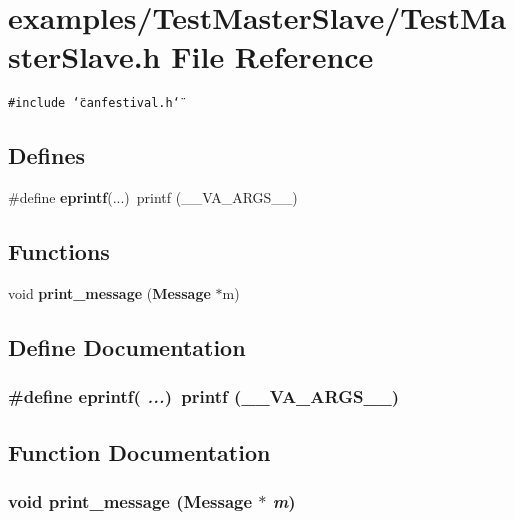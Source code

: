 \section{examples/Test\-Master\-Slave/Test\-Master\-Slave.h File Reference}
\label{TestMasterSlave_8h}
{\tt \#include \char`\"{}canfestival.h\char`\"{}}\par
\subsection*{Defines}
\begin{CompactItemize}
\item 
\#define {\bf eprintf}(...)~printf (\_\-\_\-VA\_\-ARGS\_\-\_\-)
\end{CompactItemize}
\subsection*{Functions}
\begin{CompactItemize}
\item 
void {\bf print\_\-message} ({\bf Message} $\ast$m)
\end{CompactItemize}


\subsection{Define Documentation}
\subsubsection{\setlength{\rightskip}{0pt plus 5cm}\#define eprintf( {\em ...})~printf (\_\-\_\-VA\_\-ARGS\_\-\_\-)}\label{TestMasterSlave_8h_82f06ace20f96f70bc165247e69fac57}




\subsection{Function Documentation}
\subsubsection{\setlength{\rightskip}{0pt plus 5cm}void print\_\-message ({\bf Message} $\ast$ {\em m})}\label{TestMasterSlave_8h_6baa544d467cbabaf4bacadc74cc6523}


